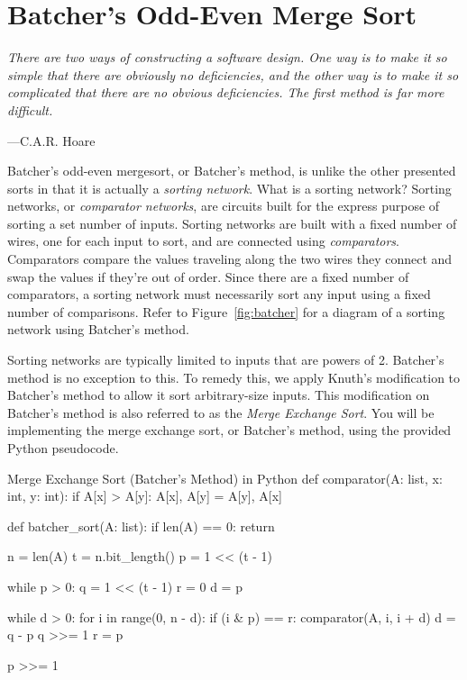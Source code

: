 \section{Batcher's Odd-Even Merge Sort}

\epigraph{\emph{There are two ways of constructing a software design.
    One way is to make it so simple that there are obviously no
    deficiencies, and the other way is to make it so complicated that
    there are no obvious deficiencies. The first method is far more
difficult.}}{---C.A.R. Hoare}

Batcher's odd-even mergesort, or Batcher's method, is unlike the other presented
sorts in that it is actually a \emph{sorting network}. What is a sorting
network? Sorting networks, or \emph{comparator networks}, are circuits built for
the express purpose of sorting a set number of inputs. Sorting networks are
built with a fixed number of wires, one for each input to sort, and are
connected using \emph{comparators}. Comparators compare the values traveling
along the two wires they connect and swap the values if they're out of order.
Since there are a fixed number of comparators, a sorting network must
necessarily sort any input using a fixed number of comparisons. Refer to
Figure~\ref{fig:batcher} for a diagram of a sorting network using Batcher's
method.

Sorting networks are typically limited to inputs that are powers of 2. Batcher's
method is no exception to this. To remedy this, we apply Knuth's modification to
Batcher's method to allow it sort arbitrary-size inputs. This modification on
Batcher's method is also referred to as the \emph{Merge Exchange Sort}. You will
be implementing the merge exchange sort, or Batcher's method, using the
provided Python pseudocode.

\begin{pylisting}{Merge Exchange Sort (Batcher's Method) in Python}
def comparator(A: list, x: int, y: int):
    if A[x] > A[y]:
        A[x], A[y] = A[y], A[x]

def batcher_sort(A: list):
    if len(A) == 0:
        return

    n = len(A)
    t = n.bit_length()
    p = 1 << (t - 1)

    while p > 0:
        q = 1 << (t - 1)
        r = 0
        d = p

        while d > 0:
            for i in range(0, n - d):
                if (i & p) == r:
                    comparator(A, i, i + d)
            d = q - p
            q >>= 1
            r = p

        p >>= 1
\end{pylisting}

